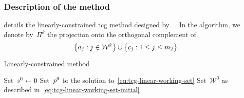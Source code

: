 \subsubsection{Description of the  method}

 details the linearly-constrained \gls{tcg} method designed by \citeauthor{Powell_2015}~\cite{Powell_2015}.
In the algorithm, we denote by~$\Pi^k$ the projection onto the orthogonal complement of
\begin{equation*}
    \set[\big]{a_j : j \in \mathcal{W}^k} \cup \set[\big]{c_j : 1 \le j \le m_2}.
\end{equation*}

\begin{algorithm}
    \caption[Linearly-constrained  method]{Linearly-constrained  method~\cite[\S~3, \S~5]{Powell_2015}}
    \label{alg:lctcg}
    \DontPrintSemicolon
    \onehalfspacing
    Set~$\sstep[0] \gets 0$\;
    Set~$\pstep[0]$ to the solution to~\cref{eq:tcg-linear-working-set}\; 
    Set~$\mathcal{W}^0$ as described in~\cref{eq:tcg-linear-working-set-initial}\; 
\end{algorithm}
